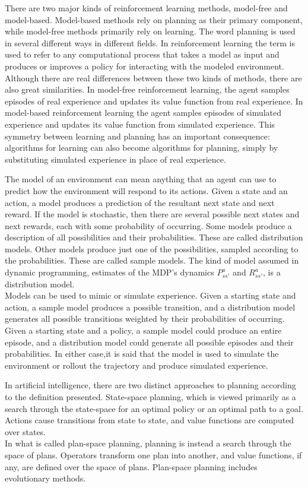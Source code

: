 There are two major kinds of reinforcement learning methods, model-free and model-based. Model-based methods rely on planning as their primary component, while model-free methods primarily rely on learning. The word planning is used in several different ways in different fields. In reinforcement learning the term is used to refer to any computational process that takes a model as input and produces or improves a policy for interacting with the modeled environment. \\
Although there are real differences between these two kinds of methods, there are also great similarities. In model-free reinforcement learning, the agent samples episodes of real experience and updates its value function from real experience. In model-based reinforcement learning the agent samples episodes of simulated experience and updates its value function from simulated experience. This symmetry between learning and planning has an important consequence: algorithms for learning can also become algorithms for planning, simply by substituting simulated experience in place of real experience.

The model of an environment can mean anything that an agent can use to predict how the environment will respond to its actions. Given a state and an action, a model produces a prediction of the resultant next state and next reward. If the model is stochastic, then there are several possible next states and next rewards, each with some probability of occurring. Some models produce a description of all possibilities and their probabilities. These are called distribution models. Other models produce just one of the possibilities, sampled according to the probabilities. These are called sample models. The kind of model assumed in dynamic programming, estimates of the MDP’s dynamics $P^a_{ss'}$ and $R^a_{ss'}$, is a distribution model. \\
Models can be used to mimic or simulate experience. Given a starting state and action, a sample model produces a possible transition, and a distribution model generates all possible transitions weighted by their probabilities of occurring. Given a starting state and a policy, a sample model could produce an entire episode, and a distribution model could generate all possible episodes and their probabilities. In either case,it is said that the model is used to simulate the environment or rollout the trajectory and produce simulated experience.

In artificial intelligence, there are two distinct approaches to planning according to the definition presented. State-space planning, which is viewed primarily as a search through the state-space for an optimal policy or an optimal path to a goal. Actions cause transitions from state to state, and value functions are computed over states. \\
In what is called plan-space planning, planning is instead a search through the space of plans. Operators transform one plan into another, and value functions, if any, are defined over the space of plans. Plan-space planning includes evolutionary methods.

